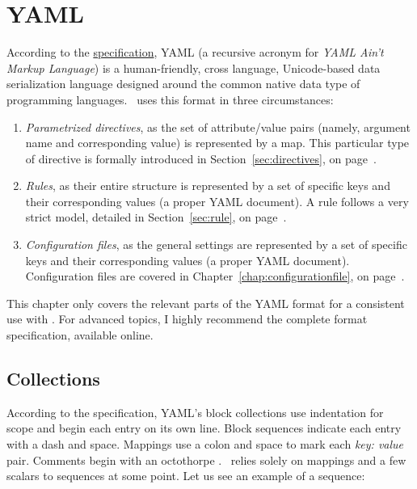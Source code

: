 \chapter{YAML}
\label{chap:yaml}

According to the \href{http://yaml.org/spec/1.2/spec.html}{specification}, YAML (a recursive acronym for \emph{YAML Ain't Markup Language}) is a human-friendly, cross language, Unicode-based data serialization language designed around the common native data type of programming languages. \arara\ uses this format in three circumstances:

\begin{enumerate}
\item\emph{Parametrized directives}, as the set of attribute/value pairs (namely, argument name and corresponding value) is represented by a map. This particular type of directive is formally introduced in Section~\ref{sec:directives}, on page~\pageref{sec:directives}.

\item\emph{Rules}, as their entire structure is represented by a set of specific keys and their corresponding values (a proper YAML document). A rule follows a very strict model, detailed in Section~\ref{sec:rule}, on page~\pageref{sec:rule}.

\item\emph{Configuration files}, as the general settings are represented by a set of specific keys and their corresponding values (a proper YAML document). Configuration files are covered in Chapter~\ref{chap:configurationfile}, on page~\pageref{chap:configurationfile}.
\end{enumerate}

This chapter only covers the relevant parts of the YAML format for a consistent use with \arara. For advanced topics, I highly recommend the complete format specification, available online.

\section{Collections}
\label{sec:yamlcollections}

According to the specification, YAML's block collections use indentation for scope and begin each entry on its own line. Block sequences indicate each entry with a dash and space. Mappings use a colon and space to mark each \emph{key: value} pair. Comments begin with an octothorpe \rbox{\#}. \arara\ relies solely on mappings and a few scalars to sequences at some point. Let us see an example of a sequence:

